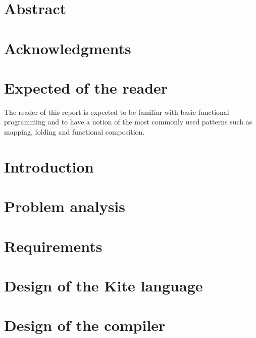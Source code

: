 \documentclass{article}
\begin{document}

\clearpage

\section*{Abstract}
\label{sec:abstract}

\clearpage

\section*{Acknowledgments}
\label{sec:acknow}


\section*{Expected of the reader}
The reader of this report is expected to be familiar with basic functional programming and to have a notion of the most commonly used patterns such as mapping, folding and functional composition.
\clearpage

\tableofcontents
\clearpage

\section{Introduction}
\label{sec:intro}

\clearpage

\section{Problem analysis}
\label{sec:probanal}

\clearpage

\section{Requirements}
\label{sec:requirements}

\clearpage

\section{Design of the Kite language}
\label{sec:kite-design}

\clearpage

\section{Design of the compiler}
\label{sec:compiler-design}

\clearpage
\end{document}
